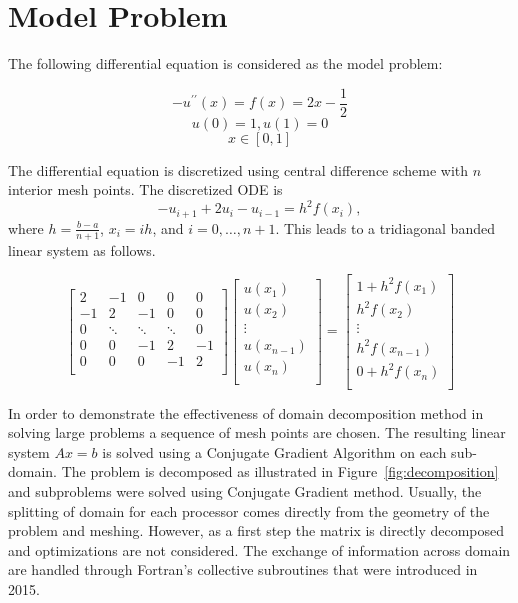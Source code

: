 \documentclass[12pt]{report}
\begin{document}
\section{Model Problem}

The following differential equation is considered as the model
problem:

$$ -u^{\prime\prime}(x) = f(x) = 2x -\frac{1}{2}$$
$$u(0) = 1, u(1) = 0 $$ 
$$x \in [0,1]$$

The differential equation is discretized using central difference
scheme with $n$ interior mesh points.  The discretized ODE is $$-
u_{i+1} +2 u_i - u_{i-1} = h^2f(x_i),$$ where $h = \frac{b-a}{n+1}$,
$x_i=ih$, and $i = 0, \ldots, n+1$. This leads to a tridiagonal banded
linear system as follows.

$$ \begin{bmatrix} 
  2 & -1  &  0 & 0 & 0\\
  -1 & 2 & -1  &  0 & 0 \\
  0 & \ddots & \ddots & \ddots & 0 \\
  0 & 0 & -1 & 2 & -1 \\ 
  0 & 0 &  0 & -1 & 2 \\  
\end{bmatrix}
\begin{bmatrix}
  u(x_1) \\
  u(x_2) \\
  \vdots\\
  u(x_{n-1}) \\
  u(x_{n}) \\
\end{bmatrix}
=
\begin{bmatrix}
  1 +  h^2f(x_1) \\
  h^2f(x_2) \\
  \vdots\\
  h^2f(x_{n-1}) \\
  0 + h^2f(x_{n}) \\
\end{bmatrix}$$  

In order to demonstrate the effectiveness of domain decomposition
method in solving large problems a sequence of mesh points are
chosen. The resulting linear system $Ax=b$ is solved using a Conjugate
Gradient Algorithm on each
sub-domain. The problem is decomposed as
illustrated in Figure~\ref{fig:decomposition} and subproblems were
solved using Conjugate Gradient method. Usually, the splitting of domain for each processor comes
directly from the geometry of the problem and meshing. However, as a
first step the matrix is directly decomposed and optimizations are not
considered. The exchange of information across domain are handled
through Fortran's collective subroutines that were introduced in 2015.
\end{document}
